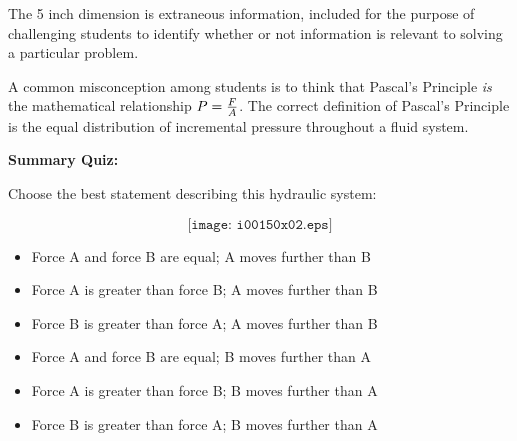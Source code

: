 The 5 inch dimension is extraneous information, included for the purpose of challenging students to identify whether or not information is relevant to solving a particular problem.

\vskip 10pt

A common misconception among students is to think that Pascal's Principle {\it is} the mathematical relationship $P = {F \over A}$.  The correct definition of Pascal's Principle is the equal distribution of incremental pressure throughout a fluid system.






\vfil \eject

\noindent
{\bf Summary Quiz:}

Choose the best statement describing this hydraulic system:

$$\texttt{[image: i00150x02.eps]}$$

\begin{itemize}
\item{} Force A and force B are equal; A moves further than B
\vskip 5pt 
\item{} Force A is greater than force B; A moves further than B 
\vskip 5pt 
\item{} Force B is greater than force A; A moves further than B 
\vskip 5pt 
\item{} Force A and force B are equal; B moves further than A
\vskip 5pt 
\item{} Force A is greater than force B; B moves further than A
\vskip 5pt 
\item{} Force B is greater than force A; B moves further than A 
\end{itemize}





